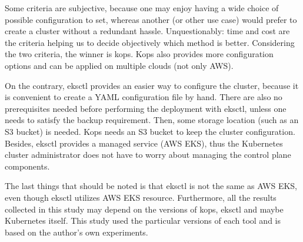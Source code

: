 Some criteria are subjective, because one may enjoy having a wide choice of possible configuration to set, whereas another (or other use case) would prefer to create a cluster without a redundant hassle. Unquestionably: time and cost are the criteria helping us to decide objectively which method is better. Considering the two criteria, the winner is kops. Kops also provides more configuration options and can be applied on multiple clouds (not only AWS).

On the contrary, eksctl provides an easier way to configure the cluster, because it is convenient to create a YAML configuration file by hand. There are also no prerequisites needed before performing the deployment with eksctl, unless one needs to satisfy the backup requirement. Then, some storage location (such as an S3 bucket) is needed. Kops needs an S3 bucket to keep the cluster configuration. Besides, eksctl provides a managed service (AWS EKS), thus the Kubernetes cluster administrator does not have to worry about managing the control plane components.

The last things that should be noted is that eksctl is not the same as AWS EKS, even though eksctl utilizes AWS EKS resource. Furthermore, all the results collected in this study may depend on the versions of kops, eksctl and maybe Kubernetes itself. This study used the particular versions of each tool and is based on the author's own experiments.
